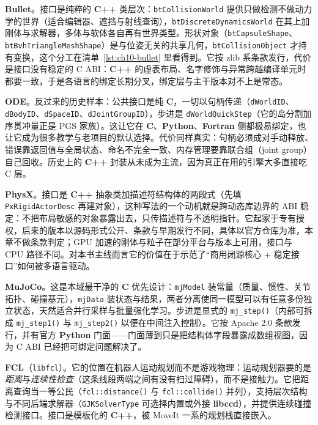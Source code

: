 \documentclass[12pt,a4paper,fontset=fandol]{ctexbook}
\newcommand{\Fn}[1]{\texttt{#1()}}
\newcommand{\Tp}[1]{\texttt{#1}}
\newcommand{\Bk}{\allowbreak}
\newcommand{\Lib}[1]{\textbf{#1}}
\newcommand{\Lang}[1]{\textsf{\bfseries #1}}
\newcommand{\CL}{\Lang{C}}
\newcommand{\CPP}{\Lang{C++}}
\newcommand{\FTN}{\Lang{Fortran}}
\newcommand{\PY}{\Lang{Python}}
\begin{document}
\textbf{\Lib{Bullet}}。接口是纯粹的 \CPP{} 类层次：\Tp{bt\Bk Collision\Bk World} 提供只做检测不做动力学的世界（适合编辑器、遮挡与射线查询），\Tp{bt\Bk Discrete\Bk Dynamics\Bk World} 在其上加刚体与求解器，多体与软体各自再有世界类型。形状对象（\Tp{bt\Bk Capsule\Bk Shape}、\Tp{bt\Bk BvhTriangle\Bk Mesh\Bk Shape}）是与位姿无关的共享几何，\Tp{bt\Bk Collision\Bk Object} 才持有变换，这个分工在清单~\ref{lst:ch10-bullet} 里看得到。它按 zlib 系条款发行，代价是接口没有稳定的 C ABI：\CPP{} 的虚表布局、名字修饰与异常跨越编译单元时都要一致，于是各语言的绑定长期分叉，绑定层与主干版本对不上是常态。

\textbf{\Lib{ODE}}。反过来的历史样本：公共接口是纯 \CL{}，一切以句柄传递（\Tp{dWorldID}、\Tp{dBodyID}、\Tp{dSpaceID}、\Tp{dJoint\Bk GroupID}），步进是 \Tp{dWorld\Bk Quick\Bk Step}（它的岛分割加序贯冲量正是 PGS 家族）。这让它在 \CL{}、\PY{}、\FTN{} 侧都极易绑定，也让它成为很多教学与老项目的默认选择。代价同样真实：句柄必须成对手动释放、错误靠返回值与全局状态、命名不完全一致、内存管理要靠联合组（joint group）自己回收。历史上的 \CPP{} 封装从未成为主流，因为真正在用的引擎大多直接吃 C 层。

\textbf{\Lib{PhysX}}。接口是 \CPP{} 抽象类加描述符结构体的两段式（先填 \Tp{Px\Bk Rigid\Bk Actor\Bk Desc} 再建对象），这种写法的一个动机就是跨动态库边界的 ABI 稳定：不把布局敏感的对象暴露出去，只传描述符与不透明指针。它起家于专有授权，后来的版本以源码形式公开、条款与早期发行不同，具体以官方仓库为准，本章不做条款判定；GPU 加速的刚体与粒子在部分平台与版本上可用，接口与 CPU 路径不同。对本书主线而言它的价值在于示范了``商用闭源核心 + 稳定接口''如何被多语言驱动。

\textbf{\Lib{MuJoCo}}。这是本域最干净的 \CL{} 优先设计：\Tp{mj\Bk Model} 装常量（质量、惯性、关节拓扑、碰撞基元），\Tp{mj\Bk Data} 装状态与结果，两者分离使同一模型可以有任意多份独立状态，天然适合并行采样与批量强化学习。步进是显式的 \Fn{mj\_step}（内部可拆成 \Fn{mj\_step1} 与 \Fn{mj\_step2} 以便在中间注入控制）。它按 Apache 2.0 条款发行，并有官方 \PY{} 门面——门面薄到只是把结构体字段暴露成数组视图，因为 C ABI 已经把可绑定问题解决了。

\textbf{\Lib{FCL}}（\Tp{libfcl}）。它的位置在机器人运动规划而不是游戏物理：运动规划器要的是\emph{距离}与\emph{连续性检查}（这条线段两端之间有没有扫过障碍），而不是接触力。它把距离查询当一等公民（\Fn{fcl::\Bk distance} 与 \Fn{fcl::\Bk collide} 并列），支持层次结构与不同后端求解器（\Tp{GJK\Bk Solver\Bk Type} 可选择内置或外接 \Lib{libccd}），并提供连续碰撞检测接口。接口是模板化的 \CPP{}，被 MoveIt 一系的规划栈直接嵌入。
\end{document}

